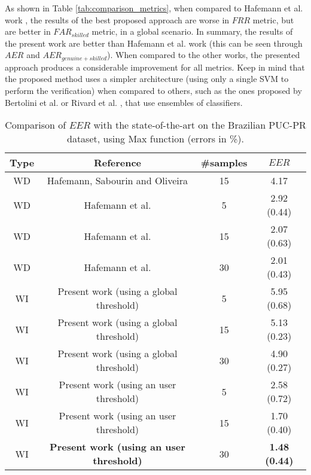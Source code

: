 \documentclass[conference]{IEEEtran}
\begin{document}
As shown in Table \ref{tab:comparison_metrics}, when compared to Hafemann et al. work \cite{hafemann:17}, the results of the best proposed approach are worse in $FRR$ metric, but are better in  $FAR_{skilled}$ metric, in a global scenario. In summary, the results of the present work are better than Hafemann et al. work \cite{hafemann:17} (this can be seen through $AER$ and $AER_{genuine+skilled}$). 
When compared to the other works, the presented approach produces a considerable improvement for all metrics. Keep in mind that the proposed method uses a simpler architecture (using only a single SVM to perform the verification) when compared to others, such as the ones proposed by Bertolini et al. \cite{bertolini:10} or Rivard et al. \cite{rivard:13}, that use ensembles of classifiers.




\begin{table}[!htb]
\caption{Comparison of $EER$ with the state-of-the-art on the Brazilian PUC-PR dataset, using Max function (errors in \%).}
\label{tab:comparison_ERR_userthreshold}
\scriptsize
\centering


\begin{tabular}{cccc}
\hline
Type & Reference & \#samples & $EER$ \\ 
\hline
WD & Hafemann, Sabourin and Oliveira \cite{hafemann:16} & 15  &  4.17 \\ 
WD & Hafemann et al. \cite{hafemann:17} & 5  &  2.92 (0.44) \\ 
WD & Hafemann et al. \cite{hafemann:17} & 15  &  2.07 (0.63) \\ 
WD & Hafemann et al. \cite{hafemann:17} & 30  &  2.01 (0.43) \\ 
WI & Present work (using a global threshold) & 5 & 5.95 (0.68) \\
WI & Present work (using a global threshold) & 15 & 5.13 (0.23) \\
WI & Present work (using a global threshold) & 30 & 4.90 (0.27) \\ 
WI & Present work (using an user threshold)  & 5 & 2.58 (0.72) \\ 
WI & Present work (using an user threshold)  & 15 & 1.70 (0.40) \\ 
WI & \textbf{Present work (using an user threshold)}  & 30 & \textbf{1.48 (0.44)} \\ 
\hline


\end{tabular}
\end{table}
\end{document}
